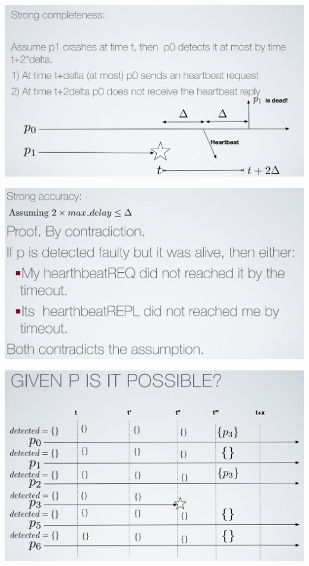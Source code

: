 \documentclass[11pt, a4paper]{article}
\begin{document}
\begin{center}
    \includegraphics[scale=0.5]{img/FD/PoSC.png}
\end{center}
\begin{center}
    \includegraphics[scale=0.5]{img/FD/PoSA.png}
\end{center}
\begin{center}
    \includegraphics[scale=0.5]{img/FD/Example1.png}
\end{center}
\end{document}
